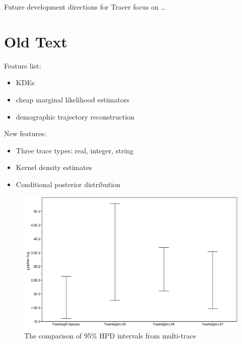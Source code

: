 \documentclass{bioinfo}
\begin{document}
Future development directions for Tracer focus on \ldots



\section*{Old Text}



Feature list:
\begin{itemize}
\item KDEs
\item cheap marginal likelihood estimators
\item demographic trajectory reconstruction
\end{itemize}

New features:
\begin{itemize}
\item Three trace types: real, integer, string
\item Kernel density estimates
\item Conditional posterior distribution
\end{itemize}

\begin{figure}[H]
\includegraphics[width=.5\textwidth]{./figures/comp-95HPD.pdf}  
\caption{The comparison of  95\% HPD intervals from multi-trace}
\label{fig:comp95HPD}
\end{figure}
\end{document}
